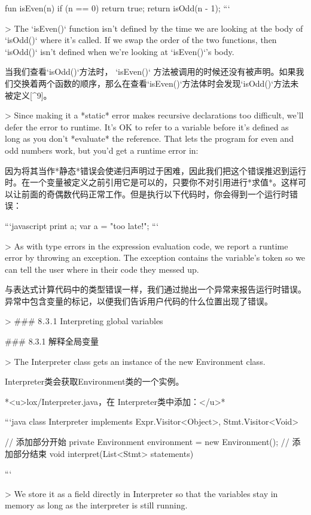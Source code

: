 \documentclass[cn,11pt,chinese]{elegantbook}
\begin{document}
{{{{{fun isEven(n) {
  if (n == 0) return true;
  return isOdd(n - 1);
}
```

> The `isEven()` function isn’t defined by the time we are looking at the body of `isOdd()` where it’s called. If we swap the order of the two functions, then `isOdd()` isn’t defined when we’re looking at `isEven()`’s body.

当我们查看`isOdd()`方法时， `isEven()` 方法被调用的时候还没有被声明。如果我们交换着两个函数的顺序，那么在查看`isEven()`方法体时会发现`isOdd()`方法未被定义[^9]。

> Since making it a *static* error makes recursive declarations too difficult, we’ll defer the error to runtime. It’s OK to refer to a variable before it’s defined as long as you don’t *evaluate* the reference. That lets the program for even and odd numbers work, but you’d get a runtime error in:

因为将其当作*静态*错误会使递归声明过于困难，因此我们把这个错误推迟到运行时。在一个变量被定义之前引用它是可以的，只要你不对引用进行*求值*。这样可以让前面的奇偶数代码正常工作。但是执行以下代码时，你会得到一个运行时错误：

```javascript
print a;
var a = "too late!";
```

> As with type errors in the expression evaluation code, we report a runtime error by throwing an exception. The exception contains the variable’s token so we can tell the user where in their code they messed up.

与表达式计算代码中的类型错误一样，我们通过抛出一个异常来报告运行时错误。异常中包含变量的标记，以便我们告诉用户代码的什么位置出现了错误。

> ### 8 . 3 . 1 Interpreting global variables

### 8.3.1 解释全局变量

> The Interpreter class gets an instance of the new Environment class.

Interpreter类会获取Environment类的一个实例。

*<u>lox/Interpreter.java，在 Interpreter类中添加：</u>*

```java
class Interpreter implements Expr.Visitor<Object>,
                             Stmt.Visitor<Void> {  
  // 添加部分开始                           
  private Environment environment = new Environment();
  // 添加部分结束                             
  void interpret(List<Stmt> statements) {
```

> We store it as a field directly in Interpreter so that the variables stay in memory as long as the interpreter is still running.

}}}}}}}
\end{document}
